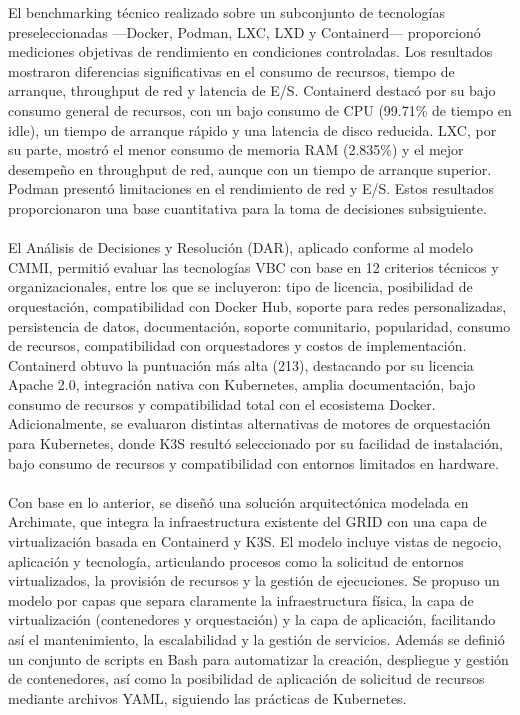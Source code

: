 \noindent
El benchmarking técnico realizado sobre un subconjunto de tecnologías preseleccionadas —Docker, Podman, LXC, LXD y Containerd— proporcionó mediciones objetivas de rendimiento en condiciones controladas. Los resultados mostraron diferencias significativas en el consumo de recursos, tiempo de arranque, throughput de red y latencia de E/S. Containerd destacó por su bajo consumo general de recursos, con un bajo consumo de CPU (99.71\% de tiempo en idle), un tiempo de arranque rápido y una latencia de disco reducida. LXC, por su parte, mostró el menor consumo de memoria RAM (2.835\%) y el mejor desempeño en throughput de red, aunque con un tiempo de arranque superior. Podman presentó limitaciones en el rendimiento de red y E/S. Estos resultados proporcionaron una base cuantitativa para la toma de decisiones subsiguiente. \\ \\
\noindent
El Análisis de Decisiones y Resolución (DAR), aplicado conforme al modelo CMMI, permitió evaluar las tecnologías VBC con base en 12 criterios técnicos y organizacionales, entre los que se incluyeron: tipo de licencia, posibilidad de orquestación, compatibilidad con Docker Hub, soporte para redes personalizadas, persistencia de datos, documentación, soporte comunitario, popularidad, consumo de recursos, compatibilidad con orquestadores y costos de implementación. Containerd obtuvo la puntuación más alta (213), destacando por su licencia Apache 2.0, integración nativa con Kubernetes, amplia documentación, bajo consumo de recursos y compatibilidad total con el ecosistema Docker. Adicionalmente, se evaluaron distintas alternativas de motores de orquestación para Kubernetes, donde K3S resultó seleccionado por su facilidad de instalación, bajo consumo de recursos y compatibilidad con entornos limitados en hardware. \\ \\
\noindent
Con base en lo anterior, se diseñó una solución arquitectónica modelada en Archimate, que integra la infraestructura existente del GRID con una capa de virtualización basada en Containerd y K3S. El modelo incluye vistas de negocio, aplicación y tecnología, articulando procesos como la solicitud de entornos virtualizados, la provisión de recursos y la gestión de ejecuciones. Se propuso un modelo por capas que separa claramente la infraestructura física, la capa de virtualización (contenedores y orquestación) y la capa de aplicación, facilitando así el mantenimiento, la escalabilidad y la gestión de servicios. Además se definió un conjunto de scripts en Bash para automatizar la creación, despliegue y gestión de contenedores, así como la posibilidad de aplicación de solicitud de recursos mediante archivos YAML, siguiendo las prácticas de Kubernetes. \\ \\
